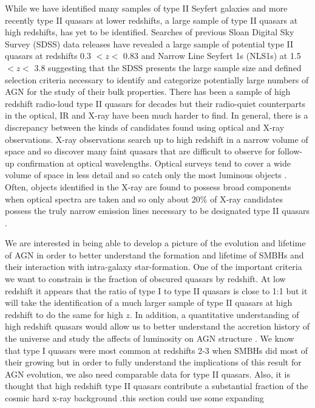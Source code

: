 \documentclass[preprint]{aastex}
\begin{document}
While we have identified many samples of type II Seyfert galaxies and more recently type II quasars at lower redshifts, a large sample of type II quasars at high redshifts, has yet to be identified.  Searches of previous Sloan Digital Sky Survey (SDSS) data releases have revealed a large sample of potential type II quasars at redshifts 0.3 $< z <$ 0.83 \citep[see, for example][]{2003AJ....126.2125Z} and Narrow Line Seyfert 1s (NLS1s) at 1.5 $< z <$ 3.8 \citep[see, for example][]{hassen} suggesting that the SDSS presents the large sample size and defined selection criteria necessary to identify and categorize potentially large numbers of AGN for the study of their bulk properties.  There has been a sample of high redshift radio-loud type II quasars for decades but their radio-quiet counterparts in the optical,  IR and X-ray have been much harder to find.  In general, there is a discrepancy between the kinds of candidates found using optical and X-ray observations.  X-ray observations search up to high redshift in a narrow volume of space and so discover many faint quasars that are difficult to observe for follow-up confirmation at optical wavelengths.  Optical surveys tend to cover a wide volume of space in less detail and so catch only the most luminous objects \citep{2003AJ....126.2125Z}.  Often, objects identified in the X-ray are found to possess broad components when optical spectra are taken and so only about 20$\%$ of X-ray candidates possess the truly narrow emission lines necessary to be designated type II quasars \citep{2003AJ....126.2125Z}.   

We are interested in being able to develop a picture of the evolution and lifetime of AGN in order to better understand the formation and lifetime of SMBHs and their interaction with intra-galaxy star-formation.  One of the important criteria we want to constrain is the fraction of obscured quasars by redshift.  At low redshift it appears that the ratio of type I to type II quasars is close to 1:1 \citep[see][]{2008AJ....136.2373R} but it will take the identification of a much larger sample of type II quasars at high redshift to do the same for high $z$.  In addition, a quantitative understanding of high redshift quasars would allow us to better understand the accretion history of the universe and study the affects of luminosity on AGN structure \citep{2008AJ....136.2373R}.  We know that type I quasars were most common at redshifts 2-3 when SMBHs did most of their growing but in order to fully understand the implications of this result for AGN evolution, we also need comparable data for type II quasars.  Also, it is thought that high redshift type II quasars contribute a substantial fraction of the cosmic hard x-ray background \citep{2003AJ....126.2125Z}.\color{red}this section could use some expanding\color{black}
\end{document}
